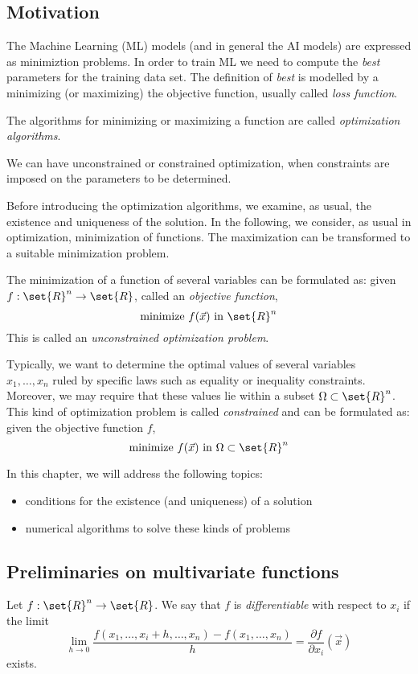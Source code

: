 \subsection{Motivation}

The Machine Learning (ML) models (and in general the AI models) are expressed as minimiztion problems. In order to train ML we need to compute the \textit{best} parameters for the training data set.
The definition of \textit{best} is modelled by a minimizing (or maximizing) the objective function, usually called \textit{loss function}. 

The algorithms for minimizing or maximizing a function are called \textit{optimization algorithms}.

We can have unconstrained or constrained optimization, when constraints are imposed on the parameters to be determined.

Before introducing the optimization algorithms, we examine, as usual, the existence and uniqueness of the solution. In the following, we consider, as usual in optimization, minimization of functions. The maximization can be transformed to a suitable minimization problem.

The minimization of a function of several variables can be formulated as: given $f: \set{R}^n \rightarrow \set{R}$, called an \textit{objective function},
$$ \text{minimize } f(\vec{x}) \text{ in } \set{R}^n $$
This is called an \textit{unconstrained optimization problem}.

Typically, we want to determine the optimal values of several variables\\ $x_1, \hdots, x_n$ ruled by specific laws such as equality or inequality constraints. Moreover, we may require that these values lie within a subset $\Omega \subset \set{R}^n$. This kind of optimization problem is called \textit{constrained} and can be formulated as: given the objective function $f$,
$$ \text{minimize } f(\vec{x}) \text{ in } \Omega \subset \set{R}^n $$

In this chapter, we will address the following topics:
\begin{itemize}
    \item conditions for the existence (and uniqueness) of a solution
    \item numerical algorithms to solve these kinds of problems
\end{itemize}

\subsection{Preliminaries on multivariate functions}
\begin{definition}
    Let $f: \set{R}^n \rightarrow \set{R}$. We say that $f$ is \textit{differentiable} with respect to $x_i$ if the limit
    $$ \lim_{h \rightarrow 0}{\frac{f(x_1, \hdots, x_i+h, \hdots, x_n) - f(x_1, \hdots, x_n)}{h}} = \frac{\partial f}{\partial x_i}(\vec{x}) $$
    exists.
\end{definition}

